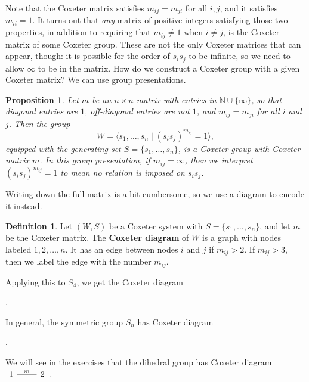 \documentclass{article}
\numberwithin{equation}{section}
\newcommand{\NN}{\mathbb{N}}
\newcommand{\newword}[1]{\textbf{#1}}
\newtheorem{proposition}[theorem]{Proposition}
\theoremstyle{remark}
\theoremstyle{definition}
\newtheorem{definition}[theorem]{Definition}
\begin{document}
	
	Note that the Coxeter matrix satisfies $m_{ij} = m_{ji}$ for all $i,j$, and it satisfies $m_{ii}=1$. It turns out that \emph{any} matrix of positive integers satisfying those two properties, in addition to requiring that $m_{ij}\neq 1$ when $i\neq j$, is the Coxeter matrix of some Coxeter group. These are not the only Coxeter matrices that can appear, though: it is possible for the order of $s_is_j$ to be infinite, so we need to allow $\infty$ to be in the matrix. How do we construct a Coxeter group with a given Coxeter matrix? We can use group presentations.
	
	\begin{proposition}
		Let $m$ be an $n\times n$ matrix with entries in $\NN\cup \{\infty\}$, so that diagonal entries are $1$, off-diagonal entries are not $1$, and $m_{ij}=m_{ji}$ for all $i$ and $j$. Then the group
		\[ W = \langle s_1,\ldots, s_n \mid  (s_is_j)^{m_{ij}}=1 \rangle, \]
		equipped with the generating set $S=\{s_1,\ldots, s_n\}$, is a Coxeter group with Coxeter matrix $m$. In this group presentation, if $m_{ij}=\infty$, then we interpret $(s_is_j)^{m_{ij}}=1$ to mean no relation is imposed on $s_is_j$.
	\end{proposition}
	
	Writing down the full matrix is a bit cumbersome, so we use a diagram to encode it instead.
	
	\begin{definition}
		Let $(W,S)$ be a Coxeter system with $S=\{s_1,\ldots,s_n\}$, and let $m$ be the Coxeter matrix. The \newword{Coxeter diagram} of $W$ is a graph with nodes labeled $1,2,\ldots, n$. It has an edge between nodes $i$ and $j$ if $m_{ij}>2$. If $m_{ij}>3$, then we label the edge with the number $m_{ij}$.
	\end{definition}
	
	Applying this to $S_4$, we get the Coxeter diagram 
	\begin{center}
		.
	\end{center}
	In general, the symmetric group $S_n$ has Coxeter diagram
	\begin{center}
		.
	\end{center}
	We will see in the exercises that the dihedral group has Coxeter diagram $\begin{tikzcd}1\ar[r,"m", no head]&2\end{tikzcd}$. 
	
\end{document}
